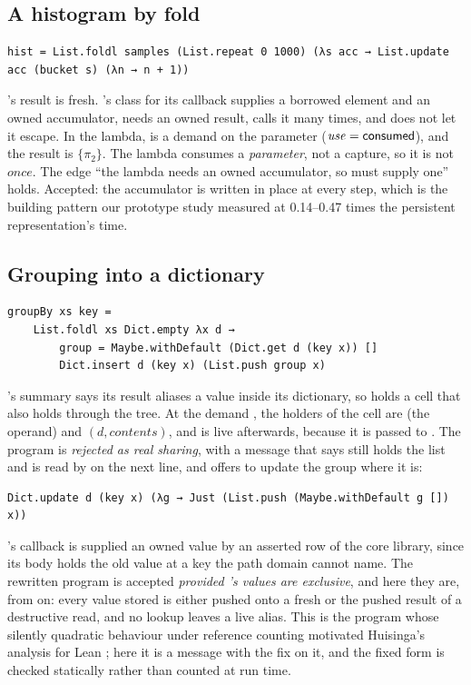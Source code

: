 \subsection{A histogram by fold}

\begin{Verbatim}
hist = List.foldl samples (List.repeat 0 1000) (λs acc → List.update acc (bucket s) (λn → n + 1))
\end{Verbatim}
's result is fresh. 's class for its callback supplies a borrowed element and an
owned accumulator, needs an owned result, calls it many times, and does not let it escape. In the lambda,
 is a demand on the parameter  ($\mathit{use} = \mathsf{consumed}$), and the
result is $\{\pi_2\}$. The lambda consumes a \emph{parameter}, not a capture, so it is not $\mathit{once}$.
The edge ``the lambda needs an owned accumulator, so  must supply one'' holds. Accepted: the
accumulator is written in place at every step, which is the building pattern our prototype study measured
at 0.14--0.47 times the persistent representation's time.

\subsection{Grouping into a dictionary}
\label{app:groupby}

\begin{Verbatim}
groupBy xs key =
    List.foldl xs Dict.empty λx d →
        group = Maybe.withDefault (Dict.get d (key x)) []
        Dict.insert d (key x) (List.push group x)
\end{Verbatim}
's summary says its result aliases a value inside its dictionary, so  holds a
cell that  also holds through the tree. At the demand , the holders of the
cell are  (the operand) and $(d, \mathit{contents})$, and  is live afterwards, because
it is passed to . The program is \emph{rejected as real sharing}, with a message that says
 still holds the list and is read by  on the next line, and offers to update the
group where it is:
\begin{Verbatim}
Dict.update d (key x) (λg → Just (List.push (Maybe.withDefault g []) x))
\end{Verbatim}
's callback is supplied an owned value by an asserted row of the core library, since its
body holds the old value at a key the path domain cannot name. The rewritten program is accepted
\emph{provided 's values are exclusive}, and here they are, from  on: every value
stored is either \code{[ x ]} pushed onto a fresh \code{[]} or the pushed result of a destructive read, and
no lookup leaves a live alias. This is the program whose silently quadratic behaviour under reference
counting motivated Huisinga's analysis for Lean \citep{huisinga2023lean}; here it is a message with the fix
on it, and the fixed form is checked statically rather than counted at run time.
